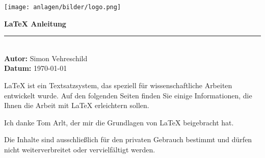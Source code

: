 \begin{titlepage}  %
    \begin{center}

        \vspace*{0.5cm}  %

        \texttt{[image: anlagen/bilder/logo.png]}
        \vspace{1cm}  %

        {\Huge \textbf{\LaTeX{} Anleitung}} \\[1.5cm]

        \rule{12cm}{0.5pt} \\[1.5cm]  %

        \textbf{\Large Autor:} {\Large Simon Vehreschild} \\[0.5cm]
        \textbf{\Large Datum:} {\Large \today} \\[3cm]

        \vfill

        {\large \LaTeX{} ist ein Textsatzsystem, das speziell für wissenschaftliche Arbeiten entwickelt wurde.
            Auf den folgenden Seiten finden Sie einige Informationen, die Ihnen die Arbeit mit \LaTeX{} erleichtern sollen.} \\[3cm]

        \vfill

        {\large Ich danke Tom Arlt, der mir die Grundlagen von \LaTeX{} beigebracht hat.}

        \vfill

        {\large Die Inhalte sind ausschließlich für den privaten Gebrauch bestimmt und dürfen nicht weiterverbreitet oder vervielfältigt werden.}

        \vfill  %
    \end{center}
\end{titlepage}